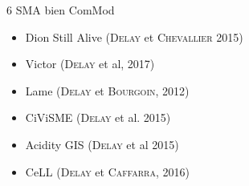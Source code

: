 \documentclass[newPxFont]{beamer}
\begin{document}
\begin{frame}[c]{6 SMA bien ComMod}
  \vspace{-2em}
  \begin{itemize}
    \item Dion Still Alive {\color{lightgray}(\textsc{Delay} et \textsc{Chevallier} 2015)}
    \item Victor {\color{lightgray}(\textsc{Delay} et al, 2017)}
    \item Lame {\color{lightgray}(\textsc{Delay} et \textsc{Bourgoin}, 2012)}
    \item CiViSME {\color{lightgray}(\textsc{Delay} et al. 2015)}
    \item Acidity GIS {\color{lightgray}(\textsc{Delay} et al 2015)}
    \item CeLL {\color{lightgray}(\textsc{Delay} et \textsc{Caffarra}, 2016)}
  \end{itemize}
  \vspace{-2em}
  \begin{figure}
    \\ %
  \end{figure}
\end{frame}
\end{document}
